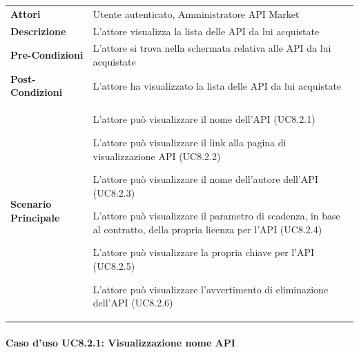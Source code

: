\begin{minipage}{\linewidth}
	\begin{tabular}{ l | p{11cm}}
		\hline
		\rowcolor{Gray}
		\multicolumn{2}{c}{UC8.2 - Visualizzazione lista API acquistate} \\
		\hline
		\textbf{Attori} & Utente autenticato, Amministratore API Market \\
		\textbf{Descrizione} & L'attore visualizza la lista delle API da lui acquistate \\
		\textbf{Pre-Condizioni} & L'attore si trova nella schermata relativa alle API da lui acquistate \\
		\textbf{Post-Condizioni} & L'attore ha visualizzato la lista delle API da lui acquistate \\
		\textbf{Scenario Principale} & 
		\begin{enumerate*}[label=(\arabic*.),itemjoin={\newline}]
			\item L'attore può visualizzare il nome dell'API (UC8.2.1)
			\item L'attore può visualizzare il link alla pagina di visualizzazione API (UC8.2.2)
			\item L'attore può visualizzare il nome dell'autore dell'API (UC8.2.3)
			\item L'attore può visualizzare il parametro di scadenza, in base al contratto,  della propria licenza per l'API (UC8.2.4)
			\item L'attore può visualizzare la propria chiave per l'API (UC8.2.5)
			\item L'attore può visualizzare l'avvertimento di eliminazione dell'API (UC8.2.6)
		\end{enumerate*}\\
	\end{tabular}
\end{minipage}

\paragraph{Caso d'uso UC8.2.1: Visualizzazione nome API}
\label{UC8_2_1}

